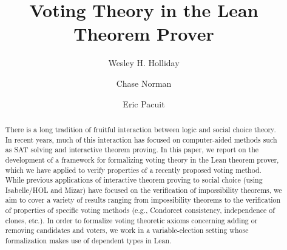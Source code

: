 \documentclass[runningheads]{llncs}
\begin{document}
%
\title{Voting Theory in the Lean Theorem Prover}

%
%
\author{Wesley H. Holliday \and
Chase Norman \and
Eric Pacuit}
%
%
%
\maketitle              %
%
\begin{abstract}
There is a long tradition of fruitful interaction between logic and social choice theory. In recent years, much of this interaction has focused on computer-aided methods such as SAT solving and interactive theorem proving. In this paper, we report on the development of a framework for formalizing voting theory in the Lean theorem prover, which we have applied to verify properties of a recently proposed voting method. While previous  applications of interactive theorem proving to social choice (using Isabelle/HOL and Mizar) have focused on the verification of impossibility theorems, we aim to cover a variety of results ranging from impossibility theorems to the verification of properties of specific voting methods (e.g., Condorcet consistency, independence of clones, etc.). In order to formalize voting theoretic axioms concerning adding or removing candidates and voters, we work in a variable-election setting whose formalization makes use of dependent types in Lean.



\end{abstract}
%
%
%
\end{document}
